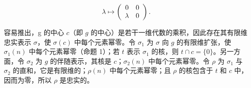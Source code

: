 \[
\lambda \mapsto \left( \begin{array}{c c} 0 & 0 \\ \lambda & 0 \end{array} \right).
\]

容易推出，g 的中心 \(c\)（即 \(g\) 的中心）是若干一维代数的乘积，因此存在其有限维忠实表示 \(\sigma\)，使 \(\sigma(c)\) 中每个元素幂零。令 \(\sigma_1\) 为 \(\sigma\) 向 \(g\) 的有限维扩张，使 \(\sigma_1(n)\) 中每个元素幂零（命题 1）；若 \(t\) 表示 \(\sigma_1\) 的核，则 \(t \cap c = \{0\}\)。另一方面，令 \(\sigma_2\) 为 \(g\) 的伴随表示，其核是 \(c\)；\(\sigma_2(n)\) 中每个元素幂零。令 \(\rho\) 为 \(\sigma_1\) 与 \(\sigma_2\) 的直和，它是有限维的；\(\rho(n)\) 中每个元素幂零；且 \(\rho\) 的核包含于 \(t\) 和 \(c\) 中，因而为零，所以 \(\rho\) 是忠实的。

